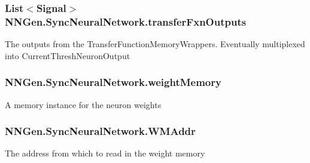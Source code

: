 \subsubsection[{transfer\+Fxn\+Outputs}]{\setlength{\rightskip}{0pt plus 5cm}List$<${\bf Signal}$>$ N\+N\+Gen.\+Sync\+Neural\+Network.\+transfer\+Fxn\+Outputs\hspace{0.3cm}{\ttfamily [get]}}\label{class_n_n_gen_1_1_sync_neural_network_a5d11d979c5498deaa585533ef25883ce}


The outputs from the Transfer\+Function\+Memory\+Wrappers. Eventually multiplexed into Current\+Thresh\+Neuron\+Output 

\hypertarget{class_n_n_gen_1_1_sync_neural_network_a372529d19a342c3636c76319bc91af9a}{}
\subsubsection[{weight\+Memory}]{ N\+N\+Gen.\+Sync\+Neural\+Network.\+weight\+Memory\hspace{0.3cm}{\ttfamily [get]}}\label{class_n_n_gen_1_1_sync_neural_network_a372529d19a342c3636c76319bc91af9a}


A memory instance for the neuron weights 

\hypertarget{class_n_n_gen_1_1_sync_neural_network_a26d6d7d846eadc650f466ec37b69c2cb}{}
\subsubsection[{W\+M\+Addr}]{ N\+N\+Gen.\+Sync\+Neural\+Network.\+W\+M\+Addr\hspace{0.3cm}{\ttfamily [get]}}\label{class_n_n_gen_1_1_sync_neural_network_a26d6d7d846eadc650f466ec37b69c2cb}


The address from which to read in the weight memory 

\hypertarget{class_n_n_gen_1_1_sync_neural_network_ad0473c03570ed0231da8b2d62487b99a}{}
